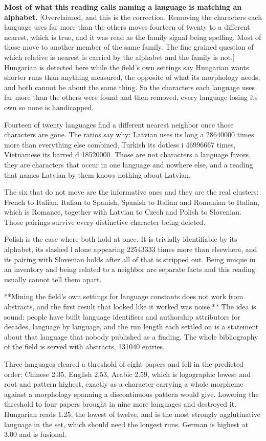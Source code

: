 \textbf{Most of what this reading calls naming a language is matching an alphabet.} [Overclaimed, and this is the correction. Removing the characters each language uses far more than the others moves fourteen of twenty to a different nearest, which is true, and it was read as the family signal being spelling. Most of those move to another member of the same family. The fine grained question of which relative is nearest is carried by the alphabet and the family is not.] Hungarian is detected here while the field's own settings say Hungarian wants shorter runs than anything measured, the opposite of what its morphology needs, and both cannot be about the same thing. So the characters each language uses far more than the others were found and then removed, every language losing its own so none is handicapped.

Fourteen of twenty languages find a different nearest neighbor once those characters are gone. The ratios say why: Latvian uses its long a 28640000 times more than everything else combined, Turkish its dotless i 46996667 times, Vietnamese its barred d 18520000. Those are not characters a language favors, they are characters that occur in one language and nowhere else, and a reading that names Latvian by them knows nothing about Latvian.

The six that do not move are the informative ones and they are the real clusters: French to Italian, Italian to Spanish, Spanish to Italian and Romanian to Italian, which is Romance, together with Latvian to Czech and Polish to Slovenian. Those pairings survive every distinctive character being deleted.

Polish is the case where both hold at once. It is trivially identifiable by its alphabet, its slashed l alone appearing 22543333 times more than elsewhere, and its pairing with Slovenian holds after all of that is stripped out. Being unique in an inventory and being related to a neighbor are separate facts and this reading usually cannot tell them apart.

**Mining the field's own settings for language constants does not work from abstracts, and the first result that looked like it worked was noise.** The idea is sound: people have built language identifiers and authorship attributors for decades, language by language, and the run length each settled on is a statement about that language that nobody published as a finding. The whole bibliography of the field is served with abstracts, 131040 entries.

Three languages cleared a threshold of eight papers and fell in the predicted order: Chinese 2.35, English 2.53, Arabic 2.59, which is logographic lowest and root and pattern highest, exactly as a character carrying a whole morpheme against a morphology spanning a discontinuous pattern would give. Lowering the threshold to four papers brought in nine more languages and destroyed it. Hungarian reads 1.25, the lowest of twelve, and is the most strongly agglutinative language in the set, which should need the longest runs. German is highest at 3.00 and is fusional.

